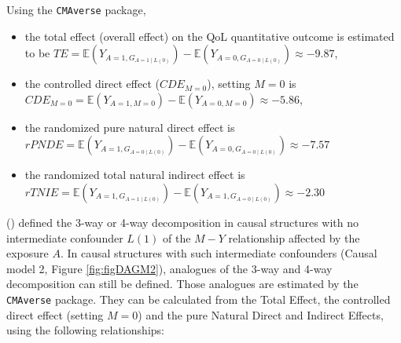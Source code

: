 \documentclass[
]{book}
\providecommand{\tightlist}{%
  \setlength{\itemsep}{0pt}\setlength{\parskip}{0pt}}
\begin{document}
Using the \texttt{CMAverse} package,

\begin{itemize}
\tightlist
\item
  the total effect (overall effect) on the QoL quantitative outcome is estimated to be \(TE = \mathbb{E}\left(Y_{A=1,G_{A=1\mid L(0)}} \right) - \mathbb{E}\left(Y_{A=0,G_{A=0\mid L(0)}} \right) \approx -9.87\),
\item
  the controlled direct effect (\(CDE_{M=0}\)), setting \(M=0\) is \(CDE_{M=0}=\mathbb{E}\left(Y_{A=1,M=0} \right) - \mathbb{E}\left(Y_{A=0,M=0} \right)\approx -5.86\),
\item
  the randomized pure natural direct effect is \(rPNDE = \mathbb{E}\left(Y_{A=1,G_{A=0\mid L(0)}} \right) - \mathbb{E}\left(Y_{A=0,G_{A=0\mid L(0)}} \right)\approx -7.57\)
\item
  the randomized total natural indirect effect is \(rTNIE = \mathbb{E}\left(Y_{A=1,G_{A=1\mid L(0)}} \right) - \mathbb{E}\left(Y_{A=1,G_{A=0\mid L(0)}} \right)\approx -2.30\)
\end{itemize}

() defined the 3-way or 4-way decomposition in causal structures with no intermediate confounder \(L(1)\) of the \(M-Y\) relationship affected by the exposure \(A\). In causal structures with such intermediate confounders (Causal model 2, Figure \ref{fig:figDAGM2}), analogues of the 3-way and 4-way decomposition can still be defined. Those analogues are estimated by the \texttt{CMAverse} package. They can be calculated from the Total Effect, the controlled direct effect (setting \(M=0\)) and the pure Natural Direct and Indirect Effects, using the following relationships:
\end{document}
